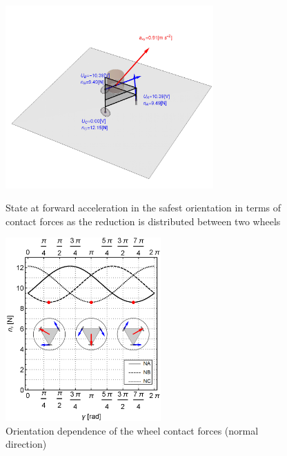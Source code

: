 \documentclass[12pt,english,twoside]{article}
\begin{document}
\begin{figure}[htb!]
	\centering
	\includegraphics[height=7cm]{figures/accelerationState}
	\caption{State at forward acceleration in the safest orientation in terms of contact forces as the reduction is distributed between two wheels}
	\label{accelerationState}
	\endminipage\hfill
	\centering
	\includegraphics[height=7cm]{figures/dangerousOri.png}
	\caption{Orientation dependence of the wheel contact forces (normal direction)}
	\label{dangerousOri}
	\endminipage\hfill
\end{figure}
\end{document}
